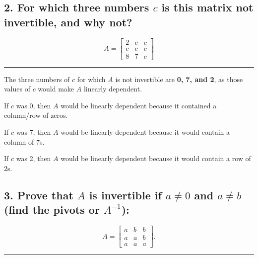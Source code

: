 \documentclass[
  letterpaper,
  DIV=11,
  numbers=noendperiod]{scrartcl}
\begin{document}
\newpage{}

\hypertarget{for-which-three-numbers-c-is-this-matrix-not-invertible-and-why-not}{%
\subsection{\texorpdfstring{2. For which three numbers \(c\) is this
matrix not invertible, and why
not?}{2. For which three numbers c is this matrix not invertible, and why not?}}\label{for-which-three-numbers-c-is-this-matrix-not-invertible-and-why-not}}

\[
A = \begin{bmatrix}
2 & c & c \\
c & c & c \\
8 & 7 & c
\end{bmatrix}
\]

\centering \textcolor[RGB]{0,0,0}{\rule{\linewidth}{0.6pt}}

The three numbers of \(c\) for which \(A\) is not invertible are
\textbf{0, 7, and 2}, as those values of \(c\) would make \(A\) linearly
dependent.

If \(c\) was 0, then \(A\) would be linearly dependent because it
contained a column/row of zeros.

If \(c\) was 7, then \(A\) would be linearly dependent because it would
contain a column of 7s.

If \(c\) was 2, then \(A\) would be linearly dependent because it would
contain a row of 2s.

\newpage{}

\hypertarget{prove-that-a-is-invertible-if-a-ne-0-and-a-ne-b-find-the-pivots-or-a-1}{%
\subsection{\texorpdfstring{3. Prove that \(A\) is invertible if
\(a \ne 0\) and \(a \ne b\) (find the pivots or
\(A^{-1}\)):}{3. Prove that A is invertible if a \textbackslash ne 0 and a \textbackslash ne b (find the pivots or A\^{}\{-1\}):}}\label{prove-that-a-is-invertible-if-a-ne-0-and-a-ne-b-find-the-pivots-or-a-1}}

\[
A = \begin{bmatrix}
a & b & b \\
a & a & b \\
a & a & a
\end{bmatrix} \text{.}
\]

\centering \textcolor[RGB]{0,0,0}{\rule{\linewidth}{0.6pt}}
\end{document}
